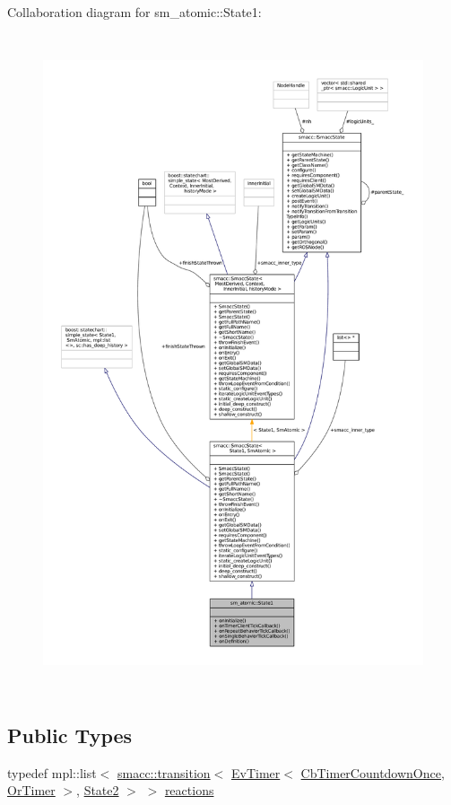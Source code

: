 Collaboration diagram for sm\+\_\+atomic\+:\+:State1\+:
\nopagebreak
\begin{figure}[H]
\begin{center}
\leavevmode
\includegraphics[height=550pt]{structsm__atomic_1_1State1__coll__graph}
\end{center}
\end{figure}
\subsection*{Public Types}
\begin{DoxyCompactItemize}
\item 
typedef mpl\+::list$<$ \hyperlink{classsmacc_1_1transition}{smacc\+::transition}$<$ \hyperlink{structros__timer__client_1_1EvTimer}{Ev\+Timer}$<$ \hyperlink{classros__timer__client_1_1CbTimerCountdownOnce}{Cb\+Timer\+Countdown\+Once}, \hyperlink{classsm__atomic_1_1OrTimer}{Or\+Timer} $>$, \hyperlink{structsm__atomic_1_1State2}{State2} $>$ $>$ \hyperlink{structsm__atomic_1_1State1_afe4b84d837f9f361aebaf0600728cdd8}{reactions}
\end{DoxyCompactItemize}
